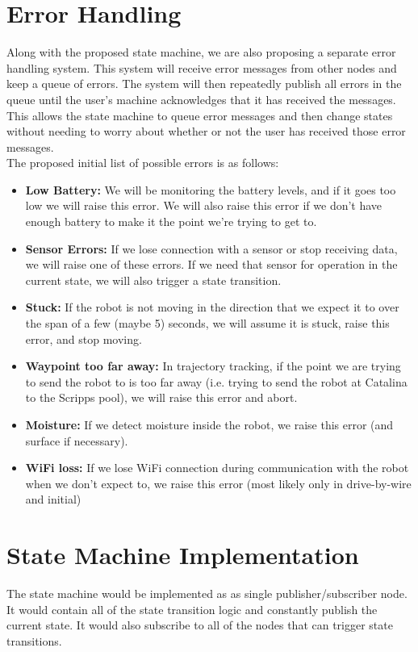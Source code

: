 \documentclass{article}
\begin{document}
\section*{Error Handling}
Along with the proposed state machine, we are also proposing a separate error handling system.
This system will receive error messages from other nodes and keep a queue of errors.
The system will then repeatedly publish all errors in the queue until the user's machine acknowledges that it has received the messages.
This allows the state machine to queue error messages and then change states without needing to worry about whether or not the user has received those error messages. \\

\noindent The proposed initial list of possible errors is as follows:
\vspace{3pt}
\begin{itemize}[nosep]
\item {\bf Low Battery:} We will be monitoring the battery levels, and if it goes too low we will raise this error. We will also raise this error if we don't have enough battery to make it the point we're trying to get to.
\item {\bf Sensor Errors:} If we lose connection with a sensor or stop receiving data, we will raise one of these errors. If we need that sensor for operation in the current state, we will also trigger a state transition.
\item {\bf Stuck:} If the robot is not moving in the direction that we expect it to over the span of a few (maybe 5) seconds, we will assume it is stuck, raise this error, and stop moving.
\item {\bf Waypoint too far away:} In trajectory tracking, if the point we are trying to send the robot to is too far away (i.e. trying to send the robot at Catalina to the Scripps pool), we will raise this error and abort.
\item {\bf Moisture:} If we detect moisture inside the robot, we raise this error (and surface if necessary).
\item {\bf WiFi loss:} If we lose WiFi connection during communication with the robot when we don't expect to, we raise this error (most likely only in drive-by-wire and initial)
\end{itemize}

\section*{State Machine Implementation}
The state machine would be implemented as as single publisher/subscriber node.
It would contain all of the state transition logic and constantly publish the current state.
It would also subscribe to all of the nodes that can trigger state transitions.
\end{document}
